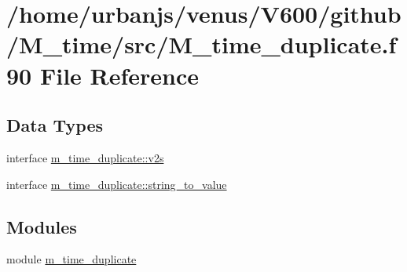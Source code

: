 \hypertarget{M__time__duplicate_8f90}{}\section{/home/urbanjs/venus/\+V600/github/\+M\+\_\+time/src/\+M\+\_\+time\+\_\+duplicate.f90 File Reference}
\label{M__time__duplicate_8f90}
\subsection*{Data Types}
\begin{DoxyCompactItemize}
\item 
interface \mbox{\hyperlink{interfacem__time__duplicate_1_1v2s}{m\+\_\+time\+\_\+duplicate\+::v2s}}
\item 
interface \mbox{\hyperlink{interfacem__time__duplicate_1_1string__to__value}{m\+\_\+time\+\_\+duplicate\+::string\+\_\+to\+\_\+value}}
\end{DoxyCompactItemize}
\subsection*{Modules}
\begin{DoxyCompactItemize}
\item 
module \mbox{\hyperlink{namespacem__time__duplicate}{m\+\_\+time\+\_\+duplicate}}
\end{DoxyCompactItemize}
